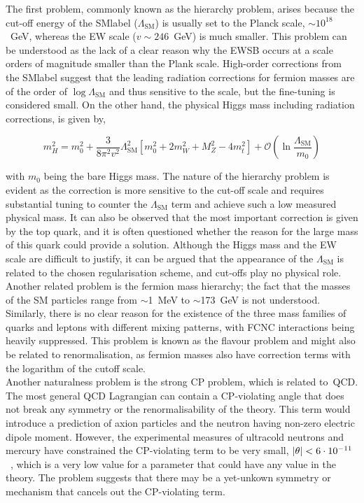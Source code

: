 The first problem, commonly known as the hierarchy problem, arises because the cut-off energy of the \acrshort{SMlabel} ($\Lambda_{\text{SM}}$) is usually set to the Planck scale, $\sim10^{18}$~GeV, whereas the \acrshort{EW} scale ($v\sim246$~GeV) is much smaller. This problem can be understood as the lack of a clear reason why the \acrshort{EWSB} occurs at a scale orders of magnitude smaller than the Plank scale. High-order corrections from the \acrshort{SMlabel} suggest that the leading radiation corrections for fermion masses are of the order of $\log\Lambda_{\text{SM}}$ and thus sensitive to the scale, but the fine-tuning is considered small. On the other hand, the physical Higgs mass including radiation corrections, is given by,

\begin{equation}
    m^2_H = m_0^2 + \frac{3}{8\pi^2v^2}\Lambda_{\text{SM}}^2 [ m_0^2 + 2m_W^2 + M_Z^2 - 4m_t^2] + \mathcal{O}(\ln\frac{\Lambda_{\text{SM}}}{m_0})
\end{equation}

with $m_0$ being the bare Higgs mass. The nature of the hierarchy problem is evident as the correction is more sensitive to the cut-off scale and requires substantial tuning to counter the $\Lambda_{\text{SM}}$ term and achieve such a low measured physical mass. It can also be observed that the most important correction is given by the top quark, and it is often questioned whether the reason for the large mass of this quark could provide a solution. Although the Higgs mass and the \acrshort{EW} scale are difficult to justify, it can be argued that the appearance of the $\Lambda_{\text{SM}}$ is related to the chosen regularisation scheme, and cut-offs play no physical role.\\

Another related problem is the fermion mass hierarchy; the fact that the masses of the SM particles range from $\sim$1~MeV to $\sim$173~GeV is not understood. Similarly, there is no clear reason for the existence of the three mass families of quarks and leptons with different mixing patterns, with FCNC interactions being heavily suppressed. This problem is known as the flavour problem and might also be related to renormalisation, as fermion masses also have correction terms with the logarithm of the cutoff scale.\\

Another naturalness problem is the strong CP problem, which is related to~\acrshort{QCD}. The most general QCD Lagrangian can contain a CP-violating angle that does not break any symmetry or the renormalisability of the theory. This term would introduce a prediction of axion particles and the neutron having non-zero electric dipole moment. However, the experimental measures of ultracold neutrons and mercury have constrained the CP-violating term to be very small, $\abs{\theta}<6\cdot10^{-11}$~\cite{PhysRevLett.124.081803}, which is a very low value for a parameter that could have any value in the theory. The problem suggests that there may be a yet-unkown symmetry or mechanism that cancels out the CP-violating term.